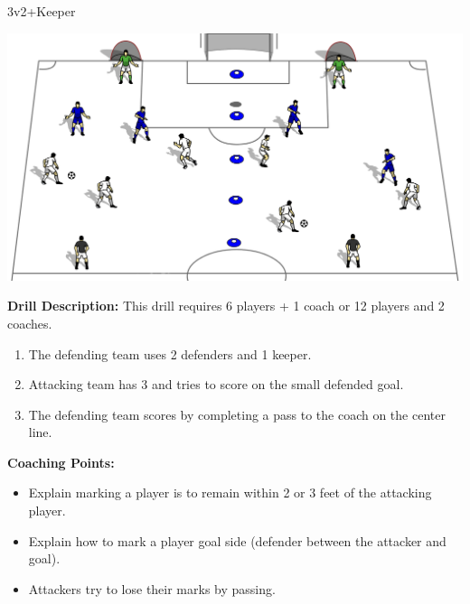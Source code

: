 \begin{evenBlock}{3v2+Keeper}

\begin{minipage}[t]{\linewidth}
    \centering
    
    \begin{minipage}{.5\linewidth} %
        \includegraphics[width=\textwidth]{../img/Trimmed/3v2+Keeper}
    \end{minipage}
    \hspace{0.05\linewidth}
    \begin{minipage}{.4\linewidth} %
        \textbf{Drill Description:}
        This drill requires 6 players + 1 coach or 12 players and 2 coaches.
        \begin{enumerate}
            \setlength{\itemsep}{0pt}
            \setlength{\parskip}{0pt}
            \setlength{\parsep}{0pt}
            \item The defending team uses 2 defenders and 1 keeper.
            \item Attacking team has 3 and tries to score on the small defended goal.
            \item The defending team scores by completing a pass to the coach on the center line.
        \end{enumerate}
    \end{minipage}
\end{minipage}
\vspace{12pt}

\textbf{Coaching Points:}
\begin{itemize}
    \setlength{\itemsep}{0pt}
    \setlength{\parskip}{0pt}
    \setlength{\parsep}{0pt}
    \item Explain marking a player is to remain within 2 or 3 feet of the attacking player.
    \item Explain how to mark a player goal side (defender between the attacker and goal).
    \item Attackers try to lose their marks by passing.
\end{itemize}
\end{evenBlock}